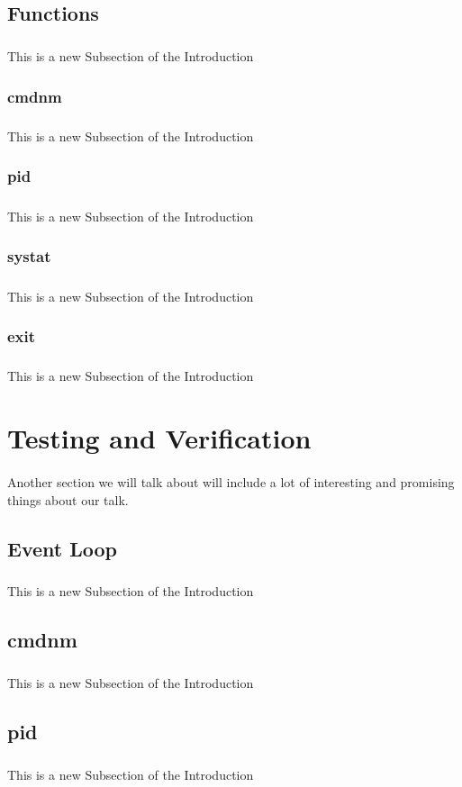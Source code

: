 \documentclass[10pt]{article}
\begin{document}
\subsection{Functions}
\subparagraph{}
This is a new Subsection of the Introduction


\subsubsection{cmdnm}
\subparagraph{}
This is a new Subsection of the Introduction

\subsubsection{pid}
\subparagraph{}
This is a new Subsection of the Introduction


\subsubsection{systat}
\subparagraph{}
This is a new Subsection of the Introduction


\subsubsection{exit}
\subparagraph{}
This is a new Subsection of the Introduction


\section{Testing and Verification}
\paragraph{}
Another section we will talk about will include a lot of interesting and promising things about our talk.

\subsection{Event Loop}
\subparagraph{}
This is a new Subsection of the Introduction

\subsection{cmdnm}
\subparagraph{}
This is a new Subsection of the Introduction

\subsection{pid}
\subparagraph{}
This is a new Subsection of the Introduction
\end{document}
